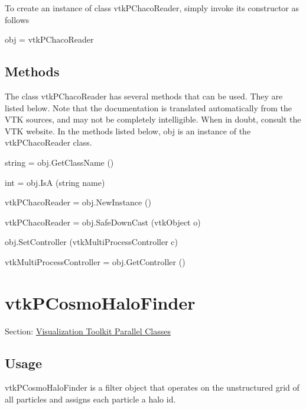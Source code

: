 To create an instance of class vtk\-P\-Chaco\-Reader, simply invoke its constructor as follows \begin{DoxyVerb}  obj = vtkPChacoReader
\end{DoxyVerb}
 \hypertarget{vtkwidgets_vtkxyplotwidget_Methods}{}\subsection{Methods}\label{vtkwidgets_vtkxyplotwidget_Methods}
The class vtk\-P\-Chaco\-Reader has several methods that can be used. They are listed below. Note that the documentation is translated automatically from the V\-T\-K sources, and may not be completely intelligible. When in doubt, consult the V\-T\-K website. In the methods listed below, {\ttfamily obj} is an instance of the vtk\-P\-Chaco\-Reader class. 
\begin{DoxyItemize}
\item {\ttfamily string = obj.\-Get\-Class\-Name ()}  
\item {\ttfamily int = obj.\-Is\-A (string name)}  
\item {\ttfamily vtk\-P\-Chaco\-Reader = obj.\-New\-Instance ()}  
\item {\ttfamily vtk\-P\-Chaco\-Reader = obj.\-Safe\-Down\-Cast (vtk\-Object o)}  
\item {\ttfamily obj.\-Set\-Controller (vtk\-Multi\-Process\-Controller c)}  
\item {\ttfamily vtk\-Multi\-Process\-Controller = obj.\-Get\-Controller ()}  
\end{DoxyItemize}\hypertarget{vtkparallel_vtkpcosmohalofinder}{}\section{vtk\-P\-Cosmo\-Halo\-Finder}\label{vtkparallel_vtkpcosmohalofinder}
Section\-: \hyperlink{sec_vtkparallel}{Visualization Toolkit Parallel Classes} \hypertarget{vtkwidgets_vtkxyplotwidget_Usage}{}\subsection{Usage}\label{vtkwidgets_vtkxyplotwidget_Usage}
vtk\-P\-Cosmo\-Halo\-Finder is a filter object that operates on the unstructured grid of all particles and assigns each particle a halo id.

